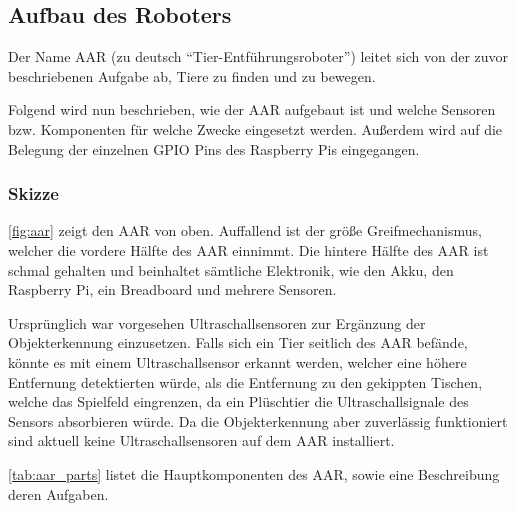 \subsection{Aufbau des Roboters}

Der Name \ac{AAR} (zu deutsch \enquote{Tier-Entführungsroboter}) leitet sich von der zuvor beschriebenen Aufgabe ab, Tiere zu finden und zu bewegen.

Folgend wird nun beschrieben, wie der \ac{AAR} aufgebaut ist und welche Sensoren bzw. Komponenten für welche Zwecke eingesetzt werden.
Außerdem wird auf die Belegung der einzelnen \ac{GPIO} Pins des Raspberry Pis eingegangen.

\subsubsection{Skizze}


\autoref{fig:aar} zeigt den \ac{AAR} von oben.
Auffallend ist der größe Greifmechanismus, welcher die vordere Hälfte des \ac{AAR} einnimmt.
Die hintere Hälfte des \ac{AAR} ist schmal gehalten und beinhaltet sämtliche Elektronik, wie den Akku, den Raspberry Pi, ein Breadboard und mehrere Sensoren. 

Ursprünglich war vorgesehen Ultraschallsensoren zur Ergänzung der Objekterkennung einzusetzen.
Falls sich ein Tier seitlich des \ac{AAR} befände, könnte es mit einem Ultraschallsensor erkannt werden, welcher eine höhere Entfernung detektierten würde, als die Entfernung zu den gekippten Tischen, welche das Spielfeld eingrenzen, da ein Plüschtier die Ultraschallsignale des Sensors absorbieren würde.
Da die Objekterkennung aber zuverlässig funktioniert sind aktuell keine Ultraschallsensoren auf dem \ac{AAR} installiert.

\autoref{tab:aar_parts} listet die Hauptkomponenten des \ac{AAR}, sowie eine Beschreibung deren Aufgaben.

